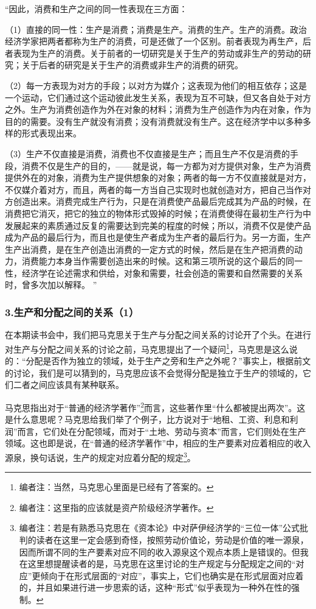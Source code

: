 \documentclass[a4paper,twoside,12pt,AutoFakeBold]{ctexart}
\begin{document}
\begin{adjustwidth}{2em}{2em}
    \qquad\fangsong
“因此，消费和生产之间的同一性表现在三方面：

（1）直接的同一性：生产是消费；消费是生产。消费的生产。生产的消费。政治经济学家把两者都称为生产的消费，可是还做了一个区别。前者表现为再生产，后者表现为生产的消费。关于前者的一切研究是关于生产的劳动或非生产的劳动的研究；关于后者的研究是关于生产的消费或非生产的消费的研究。

（2）每一方表现为对方的手段；以对方为媒介；这表现为他们的相互依存；这是一个运动，它们通过这个运动彼此发生关系，表现为互不可缺，但又各自处于对方之外。生产为消费创造作为外在对象的材料；消费为生产创造作为内在对象，作为目的的需要。没有生产就没有消费；没有消费就没有生产。这在经济学中以多种多样的形式表现出来。

（3）生产不仅直接是消费，消费也不仅直接是生产；而且生产不仅是消费的手段，消费不仅是生产的目的，——就是说，每一方都为对方提供对象，生产为消费提供外在的对象，消费为生产提供想象的对象；两者的每一方不仅直接就是对方，不仅媒介着对方，而且，两者的每一方当自己实现时也就创造对方，把自己当作对方创造出来。消费完成生产行为，只是在消费使产品最后完成其为产品的时候，在消费把它消灭，把它的独立的物体形式毁掉的时候；在消费使得在最初生产行为中发展起来的素质通过反复的需要达到完美的程度的时候；所以，消费不仅是使产品成为产品的最后行为，而且也是使生产者成为生产者的最后行为。另一方面，生产生产出消费，是在生产创造出消费的一定方式的时候，然后是在生产把消费的动力，消费能力本身当作需要创造出来的时候。这和第三项所说的这个最后的同一性，经济学在论述需求和供给，对象和需要，社会创造的需要和自然需要的关系时，曾多次加以解释。
” 
\end{adjustwidth}

\subsubsection{3.生产和分配之间的关系（1）}
在本期读书会中，我们把马克思关于生产与分配之间关系的讨论开了个头。在进行对生产与分配之间关系的讨论之前，马克思提出了一个疑问\footnote{编者注：当然，马克思心里面是已经有了答案的。}，马克思是这么说的：“分配是否作为独立的领域，处于生产之旁和生产之外呢？”事实上，根据前文的讨论，我们是可以猜到的，马克思应该不会觉得分配是独立于生产的领域的，它们二者之间应该具有某种联系。

马克思指出对于“普通的经济学著作”\footnote{编者注：这里指的应该就是资产阶级经济学著作。}而言，这些著作里“什么都被提出两次”。这是什么意思呢？马克思给我们举了个例子，比方说对于“地租、工资、利息和利润”而言，它们处在分配领域，而对于“土地、劳动与资本”而言，它们则处在生产领域。这也即是说，在“普通的经济学著作”中，相应的生产要素对应着相应的收入源泉，换句话说，生产的规定对应着分配的规定\footnote{编者注：若是有熟悉马克思在《资本论》中对萨伊经济学的“三位一体”公式批判的读者在这里一定会感到奇怪，按照劳动价值论，劳动是价值的唯一源泉，因而所谓不同的生产要素对应不同的收入源泉这个观点本质上是错误的。但我在这里想提醒读者的是，马克思在这里讨论的生产规定与分配规定之间的“对应”更倾向于在形式层面的“对应”，事实上，它们也确实是在形式层面对应着的，并且如果进行进一步思索的话，这种“形式”似乎表现为一种外在性的强制。}。
\end{document}
